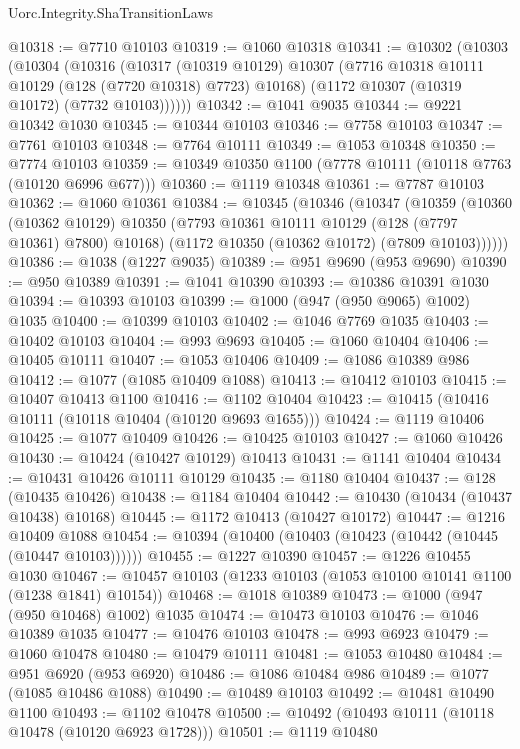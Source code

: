 \begin{lexlean}{Uorc.Integrity.ShaTransitionLaws}
\begin{coremodule}
@10318 := @7710 @10103
@10319 := @1060 @10318
@10341 := @10302
    (@10303
      (@10304
        (@10316
          (@10317
            (@10319 @10129)
            @10307
            (@7716 @10318 @10111 @10129 (@128 (@7720 @10318) @7723) @10168)
            (@1172 @10307 (@10319 @10172) (@7732 @10103))))))
@10342 := @1041 @9035
@10344 := @9221 @10342 @1030
@10345 := @10344 @10103
@10346 := @7758 @10103
@10347 := @7761 @10103
@10348 := @7764 @10111
@10349 := @1053 @10348
@10350 := @7774 @10103
@10359 := @10349 @10350 @1100 (@7778 @10111 (@10118 @7763 (@10120 @6996 @677)))
@10360 := @1119 @10348
@10361 := @7787 @10103
@10362 := @1060 @10361
@10384 := @10345
    (@10346
      (@10347
        (@10359
          (@10360
            (@10362 @10129)
            @10350
            (@7793 @10361 @10111 @10129 (@128 (@7797 @10361) @7800) @10168)
            (@1172 @10350 (@10362 @10172) (@7809 @10103))))))
@10386 := @1038 (@1227 @9035)
@10389 := @951 @9690 (@953 @9690)
@10390 := @950 @10389
@10391 := @1041 @10390
@10393 := @10386 @10391 @1030
@10394 := @10393 @10103
@10399 := @1000 (@947 (@950 @9065) @1002) @1035
@10400 := @10399 @10103
@10402 := @1046 @7769 @1035
@10403 := @10402 @10103
@10404 := @993 @9693
@10405 := @1060 @10404
@10406 := @10405 @10111
@10407 := @1053 @10406
@10409 := @1086 @10389 @986
@10412 := @1077 (@1085 @10409 @1088)
@10413 := @10412 @10103
@10415 := @10407 @10413 @1100
@10416 := @1102 @10404
@10423 := @10415 (@10416 @10111 (@10118 @10404 (@10120 @9693 @1655)))
@10424 := @1119 @10406
@10425 := @1077 @10409
@10426 := @10425 @10103
@10427 := @1060 @10426
@10430 := @10424 (@10427 @10129) @10413
@10431 := @1141 @10404
@10434 := @10431 @10426 @10111 @10129
@10435 := @1180 @10404
@10437 := @128 (@10435 @10426)
@10438 := @1184 @10404
@10442 := @10430 (@10434 (@10437 @10438) @10168)
@10445 := @1172 @10413 (@10427 @10172)
@10447 := @1216 @10409 @1088
@10454 := @10394 (@10400 (@10403 (@10423 (@10442 (@10445 (@10447 @10103))))))
@10455 := @1227 @10390
@10457 := @1226 @10455 @1030
@10467 := @10457 @10103 (@1233 @10103 (@1053 @10100 @10141 @1100 (@1238 @1841) @10154))
@10468 := @1018 @10389
@10473 := @1000 (@947 (@950 @10468) @1002) @1035
@10474 := @10473 @10103
@10476 := @1046 @10389 @1035
@10477 := @10476 @10103
@10478 := @993 @6923
@10479 := @1060 @10478
@10480 := @10479 @10111
@10481 := @1053 @10480
@10484 := @951 @6920 (@953 @6920)
@10486 := @1086 @10484 @986
@10489 := @1077 (@1085 @10486 @1088)
@10490 := @10489 @10103
@10492 := @10481 @10490 @1100
@10493 := @1102 @10478
@10500 := @10492 (@10493 @10111 (@10118 @10478 (@10120 @6923 @1728)))
@10501 := @1119 @10480

\end{coremodule}
\end{lexlean}
